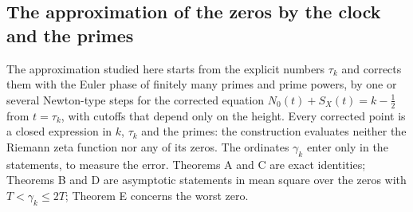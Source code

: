 \documentclass[preprint,12pt]{elsarticle}
\numberwithin{equation}{section}
\theoremstyle{plain}
\theoremstyle{definition}
\theoremstyle{remark}
\newcommand{\NO}{N_0}
\begin{document}
\subsection{The approximation of the zeros by the clock and the primes}
\label{subsec:program}
The approximation studied here starts from the explicit numbers $\tau_k$ and corrects them with the Euler phase of finitely many primes and prime powers, by one or several Newton-type steps for the corrected equation $\NO(t)+S_X(t)=k-\frac12$ from $t=\tau_k$, with cutoffs that depend only on the height. Every corrected point is a closed expression in $k$, $\tau_k$ and the primes: the construction evaluates neither the Riemann zeta function nor any of its zeros. The ordinates $\gamma_k$ enter only in the statements, to measure the error. Theorems A and C are exact identities; Theorems B and D are asymptotic statements in mean square over the zeros with $T<\gamma_k\le2T$; Theorem E concerns the worst zero.
\end{document}
